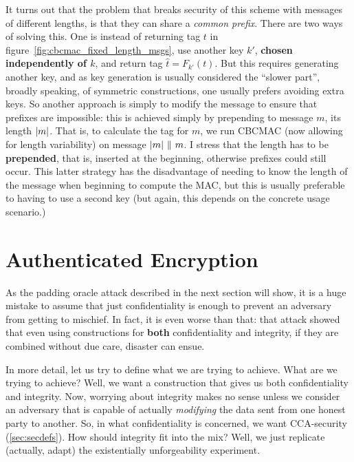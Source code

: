   It turns out that the problem that breaks security of this scheme with messages of different lengths, is that they can share a \emph{common prefix}. There are two ways of solving this. One is instead of returning tag $t$ in figure~\ref{fig:cbcmac_fixed_length_msgs}, use another key $k'$, \textbf{chosen independently of $k$}, and return tag $\hat{t} = F_{k'}(t)$. But this requires generating another key, and as key generation is usually considered the ``slower part'', broadly speaking, of symmetric constructions, one usually prefers avoiding extra keys. So another approach is simply to modify the message to ensure that prefixes are impossible: this is achieved simply by prepending to message $m$, its length $\lvert m\rvert$. That is, to calculate the tag for $m$, we run CBCMAC (now allowing for length variability) on message $\lvert m\rvert\ \|\ m$. I stress that the length has to be \textbf{prepended}, that is, inserted at the beginning, otherwise prefixes could still occur. This latter strategy has the disadvantage of needing to know the length of the message when beginning to compute the MAC, but this is usually preferable to having to use a second key (but again, this depends on the concrete usage scenario.)

\section{Authenticated Encryption}
  \label{sec:authenc}
  As the padding oracle attack described in the next section will show, it is a huge mistake to assume that just confidentiality is enough to prevent an adversary from getting to mischief. In fact, it is even worse than that: that attack showed that even using constructions for \textbf{both} confidentiality and integrity, if they are combined without due care, disaster can ensue.
  
  In more detail, let us try to define what we are trying to achieve. What are we trying to achieve? Well, we want a construction that gives us both confidentiality and integrity. Now, worrying about integrity makes no sense unless we consider an adversary that is capable of actually \emph{modifying} the data sent from one honest party to another. So, in what confidentiality is concerned, we want CCA-security (\ts\ref{sec:secdefs}). How should integrity fit into the mix? Well, we just replicate (actually, adapt) the existentially unforgeability experiment. 

  \medskip

